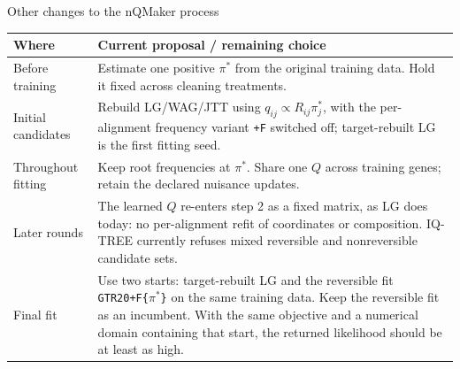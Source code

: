 \documentclass[aspectratio=169,11pt]{beamer}
\newcommand{\pis}{\pi^{\ast}}
\begin{document}
\begin{frame}{Other changes to the nQMaker process}
\small
\renewcommand{\arraystretch}{1.08}
\begin{tabularx}{\textwidth}{@{}p{}X@{}}
\toprule
\textbf{Where} & \textbf{Current proposal / remaining choice}\\
\midrule
Before training & Estimate one positive $\pis$ from the original training data. Hold it fixed across cleaning treatments.\\
Initial candidates & Rebuild LG/WAG/JTT using $q_{ij}\propto R_{ij}\pi_j^{\ast}$, with the per-alignment frequency variant \texttt{+F} switched off; target-rebuilt LG is the first fitting seed.\\
Throughout fitting & Keep root frequencies at $\pis$. Share one $Q$ across training genes; retain the declared nuisance updates.\\
Later rounds & The learned $Q$ re-enters step 2 as a fixed matrix, as LG does today: no per-alignment refit of coordinates or composition. IQ-TREE currently refuses mixed reversible and nonreversible candidate sets.\\
Final fit & Use two starts: target-rebuilt LG and the reversible fit \texttt{GTR20+F\{$\pis$\}} on the same training data. Keep the reversible fit as an incumbent. With the same objective and a numerical domain containing that start, the returned likelihood should be at least as high.\\
\bottomrule
\end{tabularx}
\end{frame}
\end{document}
